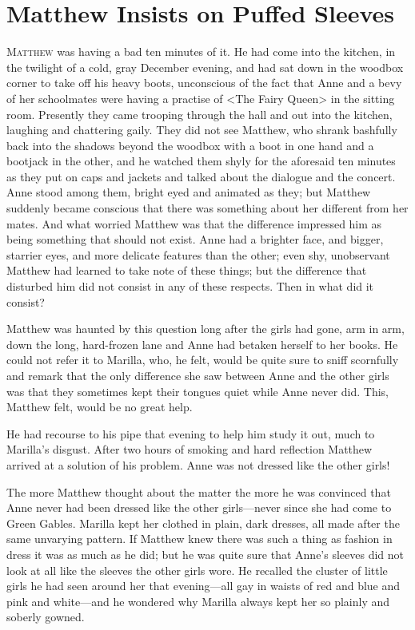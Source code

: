 \chapter{Matthew Insists on Puffed Sleeves}

\lettrine[]{M}{atthew} was having a bad ten minutes of it. He had come into the kitchen, in the twilight of a cold, gray December evening, and had sat down in the woodbox corner to take off his heavy boots, unconscious of the fact that Anne and a bevy of her schoolmates were having a practise of <The Fairy Queen> in the sitting room. Presently they came trooping through the hall and out into the kitchen, laughing and chattering gaily. They did not see Matthew, who shrank bashfully back into the shadows beyond the woodbox with a boot in one hand and a bootjack in the other, and he watched them shyly for the aforesaid ten minutes as they put on caps and jackets and talked about the dialogue and the concert. Anne stood among them, bright eyed and animated as they; but Matthew suddenly became conscious that there was something about her different from her mates. And what worried Matthew was that the difference impressed him as being something that should not exist. Anne had a brighter face, and bigger, starrier eyes, and more delicate features than the other; even shy, unobservant Matthew had learned to take note of these things; but the difference that disturbed him did not consist in any of these respects. Then in what did it consist?

Matthew was haunted by this question long after the girls had gone, arm in arm, down the long, hard-frozen lane and Anne had betaken herself to her books. He could not refer it to Marilla, who, he felt, would be quite sure to sniff scornfully and remark that the only difference she saw between Anne and the other girls was that they sometimes kept their tongues quiet while Anne never did. This, Matthew felt, would be no great help.

He had recourse to his pipe that evening to help him study it out, much to Marilla's disgust. After two hours of smoking and hard reflection Matthew arrived at a solution of his problem. Anne was not dressed like the other girls!

The more Matthew thought about the matter the more he was convinced that Anne never had been dressed like the other girls—never since she had come to Green Gables. Marilla kept her clothed in plain, dark dresses, all made after the same unvarying pattern. If Matthew knew there was such a thing as fashion in dress it was as much as he did; but he was quite sure that Anne's sleeves did not look at all like the sleeves the other girls wore. He recalled the cluster of little girls he had seen around her that evening—all gay in waists of red and blue and pink and white—and he wondered why Marilla always kept her so plainly and soberly gowned.


